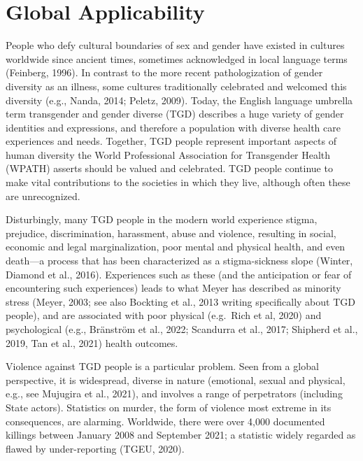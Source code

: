 \documentclass[
]{book}
\begin{document}
\hypertarget{global-applicability}{%
\chapter{Global Applicability}\label{global-applicability}}

People who defy cultural boundaries of sex and
gender have existed in cultures worldwide since
ancient times, sometimes acknowledged in local
language terms (Feinberg, 1996). In contrast to
the more recent pathologization of gender diversity
as an illness, some cultures traditionally celebrated
and welcomed this diversity (e.g., Nanda, 2014;
Peletz, 2009). Today, the English language umbrella
term transgender and gender diverse (TGD)
describes a huge variety of gender identities and
expressions, and therefore a population with
diverse health care experiences and needs. Together,
TGD people represent important aspects of human
diversity the World Professional Association for
Transgender Health (WPATH) asserts should be
valued and celebrated. TGD people continue to
make vital contributions to the societies in which
they live, although often these are unrecognized.

Disturbingly, many TGD people in the modern
world experience stigma, prejudice, discrimination, harassment, abuse and violence, resulting
in social, economic and legal marginalization,
poor mental and physical health, and even
death---a process that has been characterized as
a stigma-sickness slope (Winter, Diamond et al.,
2016). Experiences such as these (and the anticipation or fear of encountering such experiences)
leads to what Meyer has described as minority
stress (Meyer, 2003; see also Bockting et al., 2013
writing specifically about TGD people), and are
associated with poor physical (e.g.~Rich et al,
2020) and psychological (e.g., Bränström et al.,
2022; Scandurra et al., 2017; Shipherd et al., 2019,
Tan et al., 2021) health outcomes.

Violence against TGD people is a particular
problem. Seen from a global perspective, it is
widespread, diverse in nature (emotional, sexual
and physical, e.g., see Mujugira et al., 2021), and
involves a range of perpetrators (including State
actors). Statistics on murder, the form of violence
most extreme in its consequences, are alarming.
Worldwide, there were over 4,000 documented
killings between January 2008 and September
2021; a statistic widely regarded as flawed by
under-reporting (TGEU, 2020).
\end{document}
